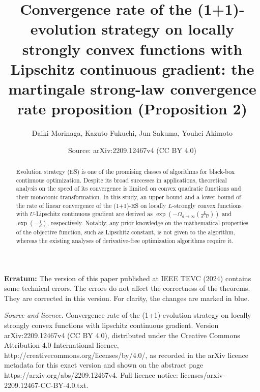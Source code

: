 \documentclass[10pt,a4paper]{amsart}
\title[The martingale strong-law convergence rate proposition]{Convergence rate of the (1+1)-evolution strategy on locally strongly convex functions with Lipschitz continuous gradient: the martingale strong-law convergence rate proposition (Proposition 2)}
\author{Daiki Morinaga, Kazuto Fukuchi, Jun Sakuma, Youhei Akimoto}
\date{Source: arXiv:2209.12467v4 (CC BY 4.0)}
\theoremstyle{plain}
\begin{document}
\maketitle
\begin{abstract}
Evolution strategy (ES) is one of the promising classes of algorithms for black-box continuous optimization.
Despite its broad successes in applications, 
theoretical analysis on the speed of its convergence is limited on convex quadratic functions and their monotonic transformation.%
In this study, an upper bound and a lower bound of the rate of linear convergence of the (1+1)-ES on locally $L$-strongly convex functions with $U$-Lipschitz continuous gradient are derived as $\exp\left(-\Omega_{d\to\infty}\left(\frac{L}{d\cdot U}\right)\right)$ and $\exp\left(-\frac1d\right)$, respectively.
Notably, any prior knowledge on the mathematical properties of the objective function, such as Lipschitz constant, is not given to the algorithm, whereas the existing analyses of derivative-free optimization algorithms require it.
\end{abstract}

\noindent\textbf{Erratum:}
The version of this paper published at IEEE TEVC (2024) contains some technical errors. The errors do not affect the correctness
of the theorems. They are corrected in this version. For clarity, the changes are marked in {\color{blue}
blue}.


\noindent\emph{Source and licence.} Convergence rate of the (1+1)-evolution strategy on locally strongly convex functions with lipschitz continuous gradient. Version arXiv:2209.12467v4 (CC BY 4.0), distributed under the Creative Commons Attribution 4.0 International licence, http://creativecommons.org/licenses/by/4.0/, as recorded in the arXiv licence metadata for this exact version and shown on the abstract page https://arxiv.org/abs/2209.12467v4. Full licence notice: licenses/arxiv-2209.12467-CC-BY-4.0.txt.\par\smallskip
\end{document}
